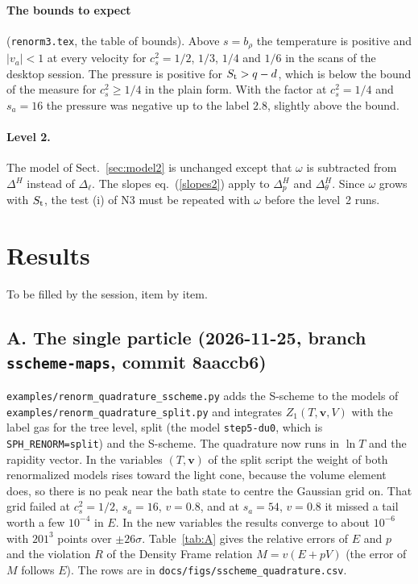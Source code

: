 \documentclass[11pt,aps,preprint,nofootinbib,superscriptaddress,tightenlines]{revtex4-2}
\def\Eq#1{eq.~(\ref{#1})}
\def\Sect#1{Sect.~\ref{#1}}
\let\oldparagraph\paragraph
\renewcommand{\paragraph}{\par\bigskip\oldparagraph}
\begin{document}
\paragraph{The bounds to expect} (\nolinkurl{renorm3.tex}, the table of bounds).  Above $s=b_\rho$ the temperature is positive and $|v_a|<1$ at every
velocity for $c_s^2=1/2$, $1/3$, $1/4$ and $1/6$ in the scans of the desktop session.  The pressure is positive for $S_{\rm t}>q-d$, which is below the
bound of the measure for $c_s^2\ge1/4$ in the plain form.  With the factor at $c_s^2=1/4$ and $s_a=16$ the pressure was negative up to the label
$2.8$, slightly above the bound.

\paragraph{Level 2.}  The model of \Sect{sec:model2} is unchanged except that $\omega$ is subtracted from $\Delta^H$ instead of $\Delta_\ell$.  The
slopes \Eq{slopes2} apply to $\Delta_p^H$ and $\Delta_\theta^H$.  Since $\omega$ grows with $S_{\rm t}$, the test (i) of N3 must be repeated with
$\omega$ before the level~2 runs.

\section{Results}
\label{sec:results}

To be filled by the session, item by item.

\subsection*{A. The single particle (2026-11-25, branch \texttt{sscheme-maps}, commit 8aaccb6)}

\nolinkurl{examples/renorm_quadrature_sscheme.py} adds the S-scheme to the models of \nolinkurl{examples/renorm_quadrature_split.py} and
integrates $Z_1(T,\bm v,V)$ with the label gas for the tree level, split (the model \texttt{step5-du0}, which is \texttt{SPH\_RENORM=split}) and the
S-scheme.  The quadrature now runs in $\ln T$ and the rapidity vector.  In the variables $(T,\bm v)$ of the split script the weight of both
renormalized models rises toward the light cone, because the volume element does, so there is no peak near the bath state to centre the Gaussian
grid on.  That grid failed at $c_s^2=1/2$, $s_a=16$, $v=0.8$, and at $s_a=54$, $v=0.8$ it missed a tail worth a few $10^{-4}$ in $E$.  In the new
variables the results converge to about $10^{-6}$ with $201^3$ points over $\pm26\sigma$.  Table~\ref{tab:A} gives the relative errors of $E$ and $p$ and
the violation $R$ of the Density Frame relation $M=v(E+pV)$ (the error of $M$ follows $E$).  The rows are in \nolinkurl{docs/figs/sscheme_quadrature.csv}.
\end{document}
